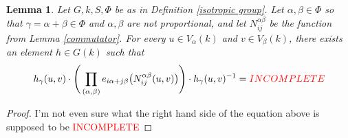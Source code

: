 \documentclass[12pt]{article}
\newtheorem{lemma}{Lemma}
\theoremstyle{definition}
\newcommand{\incomplete}{\textcolor{red}{INCOMPLETE}}
\newcommand{\inv}{^{-1}}
\begin{document}
\begin{lemma}
Let $G, k, S, \Phi$ be as in Definition \ref{isotropic group}. Let $\alpha, \beta \in \Phi$ so that $\gamma = \alpha + \beta \in \Phi$ and $\alpha, \beta$ are not proportional, and let $N_{ij}^{\alpha \beta}$ be the function from Lemma \ref{commutator}. For every $u \in V_\alpha(k)$ and $v \in V_\beta(k)$, there exists an element $h \in G(k)$ such that
\[
	h_\gamma(u,v) \cdot \Bigg( \prod_{(\alpha,\beta)} e_{i\alpha+j\beta} \big(N_{ij}^{\alpha \beta}(u,v) \big) \Bigg) \cdot h_\gamma(u,v) \inv = \incomplete
\]
\end{lemma}
\begin{proof}
I'm not even sure what the right hand side of the equation above is supposed to be  \incomplete
\end{proof}
\end{document}
